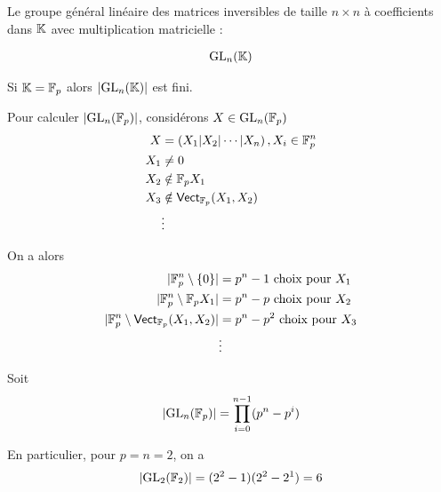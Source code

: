 \documentclass[french,a4paper,10pt]{article}
\begin{document}
	\begin{example}
		Le groupe général linéaire des matrices inversibles de taille $n\times n$ à coefficients dans $\mathbb{K}$ avec multiplication matricielle :
		
		\[\begin{aligned}
			\text{GL}_{n}(\mathbb{K})
		\end{aligned}\]
		
		\begin{remark}
			Si $\mathbb{K} = \mathbb{F}_p$ alors $|\text{GL}_{n}(\mathbb{K})|$ est fini.
		\end{remark}
		
		Pour calculer $|\text{GL}_{n}(\mathbb{F}_p)|$, considérons $X\in \text{GL}_{n}(\mathbb{F}_p)$
		\[\begin{aligned}
			X &= \left(X_1 | X_2 | \cdots | X_n\right), X_i\in \mathbb{F}_p^n\\
			X_1 &\ne 0\\
			X_2 &\notin \mathbb{F}_p X_1\\
			X_3 &\notin \operatorname{\mathsf{Vect}}_{\mathbb{F}_p}(X_1, X_2)\\
			&\vdots
		\end{aligned}\]
		
		On a alors
		\[\begin{aligned}
			|\mathbb{F}_p^n\setminus\{0\}| &= p^n-1 \text{ choix pour }X_1\\
			|\mathbb{F}_p^n\setminus\mathbb{F}_pX_1| &= p^n-p \text{ choix pour }X_2\\
			|\mathbb{F}_p^n\setminus\operatorname{\mathsf{Vect}}_{\mathbb{F}_p}(X_1, X_2)| &= p^n-p^2 \text{ choix pour }X_3\\
			&\vdots
		\end{aligned}\]
		
		Soit
		\[\begin{aligned}
			|\text{GL}_{n}(\mathbb{F}_p)| = \prod_{i=0}^{n-1}(p^n-p^i)
		\end{aligned}\]
		
		En particulier, pour $p=n=2$, on a
		\[\begin{aligned}
			|\text{GL}_{2}(\mathbb{F}_2)| = (2^2-1)(2^2-2^1)=6
		\end{aligned}\]
	\end{example}
\end{document}
